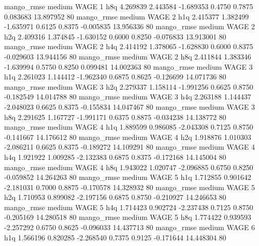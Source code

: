        mango_rmse     medium     WAGE                 1                  h8q  4.269839 2.443584 -1.689353 0.4750 0.7875  0.083683   13.897952 80
       mango_rmse     medium     WAGE                 2                  h1q  2.415377 1.382499 -1.635971 0.6125 0.8375 -0.005835   13.956336 80
       mango_rmse     medium     WAGE                 2                  h2q  2.409316 1.374845 -1.630152 0.6000 0.8250 -0.076833   13.913001 80
       mango_rmse     medium     WAGE                 2                  h4q  2.414192 1.378065 -1.628830 0.6000 0.8375 -0.029603   13.944156 80
       mango_rmse     medium     WAGE                 2                  h8q  2.411844 1.383346 -1.639994 0.5750 0.8250  0.099481   14.002363 80
       mango_rmse     medium     WAGE                 3                  h1q  2.261023 1.144412 -1.962340 0.6875 0.8625 -0.126699   14.071736 80
       mango_rmse     medium     WAGE                 3                  h2q  2.279337 1.158114 -1.991256 0.6625 0.8750 -0.182549   14.014788 80
       mango_rmse     medium     WAGE                 3                  h4q  2.263188 1.144437 -2.048023 0.6625 0.8375 -0.155834   14.047467 80
       mango_rmse     medium     WAGE                 3                  h8q  2.291625 1.167727 -1.991171 0.6375 0.8875 -0.034238   14.138772 80
       mango_rmse     medium     WAGE                 4                  h1q  1.889599 0.986085 -2.043308 0.7125 0.8750 -0.141667   14.176612 80
       mango_rmse     medium     WAGE                 4                  h2q  1.918876 1.010303 -2.086211 0.6625 0.8375 -0.189272   14.109291 80
       mango_rmse     medium     WAGE                 4                  h4q  1.921922 1.009285 -2.132383 0.6875 0.8375 -0.172168   14.145004 80
       mango_rmse     medium     WAGE                 4                  h8q  1.943022 1.020747 -2.096885 0.6750 0.8250 -0.059852   14.264263 80
       mango_rmse     medium     WAGE                 5                  h1q  1.712855 0.901642 -2.181031 0.7000 0.8875 -0.170578   14.328932 80
       mango_rmse     medium     WAGE                 5                  h2q  1.710953 0.899082 -2.197156 0.6875 0.8750 -0.210927   14.246653 80
       mango_rmse     medium     WAGE                 5                  h4q  1.714423 0.902724 -2.237438 0.7125 0.8750 -0.205169   14.280518 80
       mango_rmse     medium     WAGE                 5                  h8q  1.774422 0.939593 -2.257292 0.6750 0.8625 -0.096033   14.437713 80
       mango_rmse     medium     WAGE                 6                  h1q  1.566196 0.820285 -2.268540 0.7375 0.9125 -0.171644   14.448304 80
